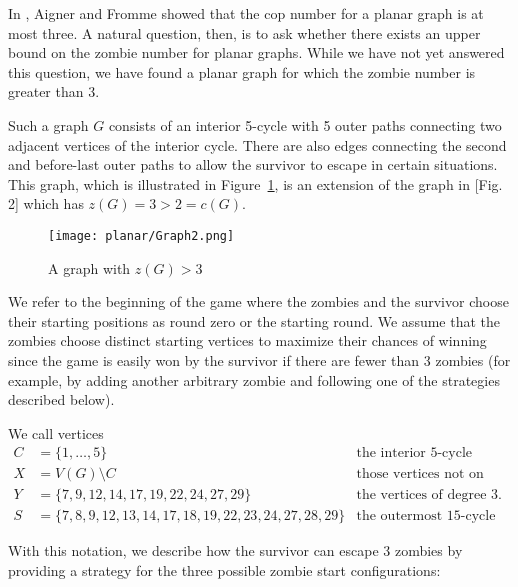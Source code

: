 In \cite{aigner1984game}, Aigner and Fromme showed that the cop number for a planar graph is at most three.
A natural question, then, is to ask whether there exists an upper bound on the zombie number for planar graphs.
While we have not yet answered this question, we have found a planar graph for which the zombie number is greater than 3.

Such a graph $G$ consists of an interior 5-cycle with 5 outer paths connecting two adjacent vertices of the interior cycle.
There are also edges connecting the second and before-last outer paths to allow the survivor to escape in certain situations.
This graph, which is illustrated in Figure~\ref{fig:planarG2}, is an extension of the graph in \cite{fitzpatrick2016deterministic}[Fig. 2] which has
$z(G) = 3 > 2 = c(G)$.


\begin{figure}
\centering
\texttt{[image: planar/Graph2.png]}
\caption{A graph with $z(G) > 3$ \label{fig:planarG2}}
\end{figure}

We refer to the beginning of the game where the zombies and the survivor choose their starting positions as round zero or the starting round.
We assume that the zombies choose distinct starting vertices to maximize their chances of winning since the game is easily won by the survivor
if there are fewer than 3 zombies (for example, by adding another arbitrary zombie and following one of the strategies described below).


We call vertices
\begin{align*}
C &= \{ 1, \dots, 5 \} & \text{the interior 5-cycle} \\
X &= V(G) \setminus C & \text{those vertices not on the interior 5-cycle} \\
Y &= \{7, 9, 12, 14, 17, 19, 22, 24, 27, 29\} & \text{the vertices of degree 3.} \\
S &= \{ 7,8,9,12,13,14,17,18,19, 22,23,24,27,28,29 \} & \text{the outermost 15-cycle}
\end{align*}

With this notation, we describe how the survivor can escape 3 zombies by providing a strategy for the three possible zombie start configurations:

